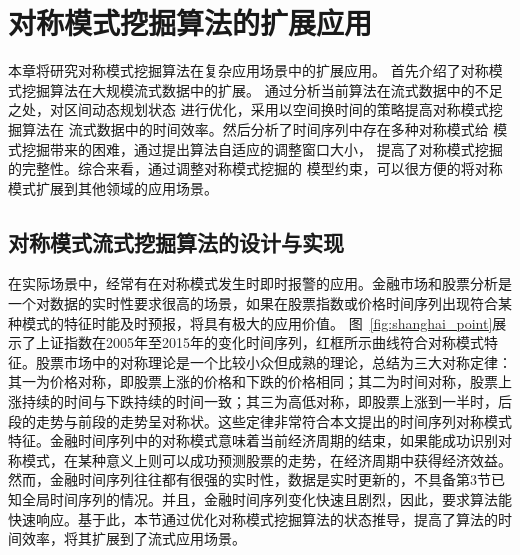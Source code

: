 
\chapter{对称模式挖掘算法的扩展应用}
本章将研究对称模式挖掘算法在复杂应用场景中的扩展应用。
首先介绍了对称模式挖掘算法在大规模流式数据中的扩展。
通过分析当前算法在流式数据中的不足之处，对区间动态规划状态
进行优化，采用以空间换时间的策略提高对称模式挖掘算法在
流式数据中的时间效率。然后分析了时间序列中存在多种对称模式给
模式挖掘带来的困难，通过提出算法自适应的调整窗口大小，
提高了对称模式挖掘的完整性。综合来看，通过调整对称模式挖掘的
模型约束，可以很方便的将对称模式扩展到其他领域的应用场景。

\section{对称模式流式挖掘算法的设计与实现}
在实际场景中，经常有在对称模式发生时即时报警的应用。金融市场和股票分析是一个对数据的实时性要求很高的场景，如果在股票指数或价格时间序列出现符合某种模式的特征时能及时预报，将具有极大的应用价值。
图~\ref{fig:shanghai_point}展示了上证指数在2005年至2015年的变化时间序列，红框所示曲线符合对称模式特征。股票市场中的对称理论是一个比较小众但成熟的理论，总结为三大对称定律：其一为价格对称，即股票上涨的价格和下跌的价格相同；其二为时间对称，股票上涨持续的时间与下跌持续的时间一致；其三为高低对称，即股票上涨到一半时，后段的走势与前段的走势呈对称状。这些定律非常符合本文提出的时间序列对称模式特征。金融时间序列中的对称模式意味着当前经济周期的结束，如果能成功识别对称模式，在某种意义上则可以成功预测股票的走势，在经济周期中获得经济效益。然而，金融时间序列往往都有很强的实时性，数据是实时更新的，不具备第3节已知全局时间序列的情况。并且，金融时间序列变化快速且剧烈，因此，要求算法能快速响应。基于此，本节通过优化对称模式挖掘算法的状态推导，提高了算法的时间效率，将其扩展到了流式应用场景。
